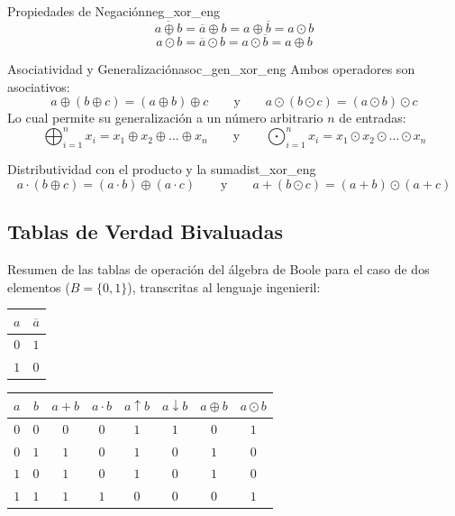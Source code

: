 \setcounter{tcb@cnt@teorema}{25}
\begin{teorema}{Propiedades de Negación}{neg_xor_eng}
\[ \overline{a \oplus b} = \overline{a} \oplus b = a \oplus \overline{b} = a \odot b \]
\[ \overline{a \odot b} = \overline{a} \odot b = a \odot \overline{b} = a \oplus b \]
\end{teorema}

\setcounter{tcb@cnt@teorema}{26}
\begin{teorema}{Asociatividad y Generalización}{asoc_gen_xor_eng}
Ambos operadores son asociativos:
\[ a \oplus (b \oplus c) = (a \oplus b) \oplus c \qquad \text{y} \qquad a \odot (b \odot c) = (a \odot b) \odot c \]
Lo cual permite su generalización a un número arbitrario $n$ de entradas:
\[ \bigoplus_{i=1}^{n} x_i = x_1 \oplus x_2 \oplus \dots \oplus x_n \qquad \text{y} \qquad \bigodot_{i=1}^{n} x_i = x_1 \odot x_2 \odot \dots \odot x_n \]
\end{teorema}

\setcounter{tcb@cnt@teorema}{28}
\begin{teorema}{Distributividad con el producto y la suma}{dist_xor_eng}
\[ a \cdot (b \oplus c) = (a \cdot b) \oplus (a \cdot c) \qquad \text{y} \qquad a + (b \odot c) = (a + b) \odot (a + c) \]
\end{teorema}

\subsection*{Tablas de Verdad Bivaluadas}

Resumen de las tablas de operación del álgebra de Boole para el caso de dos elementos ($B=\{0,1\}$), transcritas al lenguaje ingenieril:

\begin{table}[h!]
\centering
\renewcommand{\arraystretch}{1.2}
\begin{tabular}{c||c}
\hline
$a$ & $\overline{a}$ \\
\hline\hline
$0$ & $1$ \\
$1$ & $0$ \\
\hline
\end{tabular}
\qquad
\begin{tabular}{cc||c|c|c|c|c|c}
\hline
$a$ & $b$ & $a + b$ & $a \cdot b$ & $a \uparrow b$ & $a \downarrow b$ & $a \oplus b$ & $a \odot b$ \\
\hline\hline
$0$ & $0$ & $0$ & $0$ & $1$ & $1$ & $0$ & $1$ \\
$0$ & $1$ & $1$ & $0$ & $1$ & $0$ & $1$ & $0$ \\
$1$ & $0$ & $1$ & $0$ & $1$ & $0$ & $1$ & $0$ \\
$1$ & $1$ & $1$ & $1$ & $0$ & $0$ & $0$ & $1$ \\
\hline
\end{tabular}
\end{table}

\makeatother
